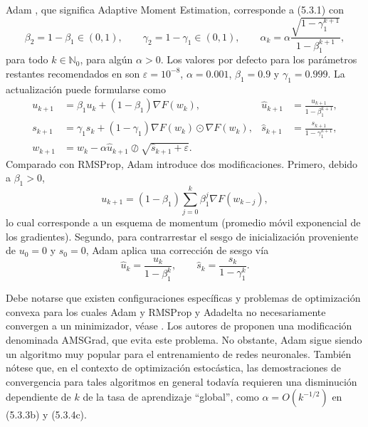 \documentclass[11pt]{report}
\theoremstyle{definition}
\theoremstyle{plain}
\numberwithin{equation}{section}
\begin{document}
Adam \cite{hinton-srivastava-swersky-2012}, que significa Adaptive Moment Estimation, corresponde a (5.3.1) con
\begin{equation*}
    \beta_2=1-\beta_1\in(0,1),
    \qquad
    \gamma_2=1-\gamma_1\in(0,1),
    \qquad
    \alpha_k
    =
    \alpha
    \frac{\sqrt{1-\gamma_1^{k+1}}}{1-\beta_1^{k+1}},
\end{equation*}
para todo \(k\in\mathbb{N}_0\), para algún \(\alpha>0\). Los valores por defecto para los parámetros restantes recomendados en \cite{hinton-srivastava-swersky-2012} son \(\varepsilon=10^{-8}\), \(\alpha=0.001\), \(\beta_1=0.9\) y \(\gamma_1=0.999\). La actualización puede formularse como
\begin{align*}
    u_{k+1}
    &=
    \beta_1u_k+(1-\beta_1)\nabla F(w_k),
    &
    \widehat{u}_{k+1}
    &=
    \frac{u_{k+1}}{1-\beta_1^{k+1}},
    \tag{5.3.4a}\\
    s_{k+1}
    &=
    \gamma_1s_k+(1-\gamma_1)\nabla F(w_k)\odot\nabla F(w_k),
    &
    \widehat{s}_{k+1}
    &=
    \frac{s_{k+1}}{1-\gamma_1^{k+1}},
    \tag{5.3.4b}\\
    w_{k+1}
    &=
    w_k-\alpha\widehat{u}_{k+1}\oslash\sqrt{\widehat{s}_{k+1}+\varepsilon}.
    \tag{5.3.4c}
\end{align*}
Comparado con RMSProp, Adam introduce dos modificaciones. Primero, debido a \(\beta_1>0\),
\begin{equation*}
    u_{k+1}
    =
    (1-\beta_1)
    \sum_{j=0}^{k}
    \beta_1^j\nabla F(w_{k-j}),
\end{equation*}
lo cual corresponde a un esquema de momentum (promedio móvil exponencial de los gradientes). Segundo, para contrarrestar el sesgo de inicialización proveniente de \(u_0=0\) y \(s_0=0\), Adam aplica una corrección de sesgo vía
\begin{equation*}
    \widehat{u}_k
    =
    \frac{u_k}{1-\beta_1^k},
    \qquad
    \widehat{s}_k
    =
    \frac{s_k}{1-\gamma_1^k}.
\end{equation*}

Debe notarse que existen configuraciones específicas y problemas de optimización convexa para los cuales Adam y RMSProp y Adadelta no necesariamente convergen a un minimizador, véase \cite{reddi-kale-kumar-2018}. Los autores de \cite{reddi-kale-kumar-2018} proponen una modificación denominada AMSGrad, que evita este problema. No obstante, Adam sigue siendo un algoritmo muy popular para el entrenamiento de redes neuronales. También nótese que, en el contexto de optimización estocástica, las demostraciones de convergencia para tales algoritmos en general todavía requieren una disminución dependiente de \(k\) de la tasa de aprendizaje ``global'', como \(\alpha=O(k^{-1/2})\) en (5.3.3b) y (5.3.4c).
\end{document}

